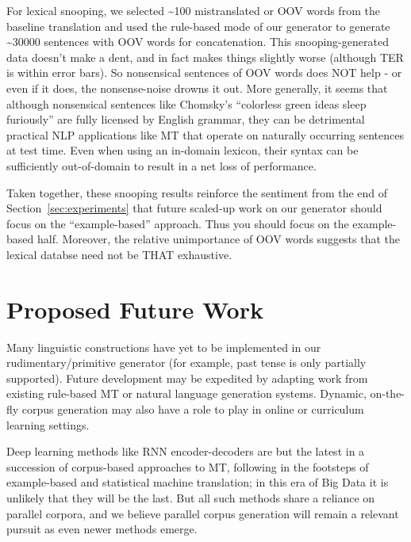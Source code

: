 {For lexical snooping, we selected \textasciitilde 100 mistranslated or OOV words from the baseline translation and used the rule-based mode of our generator to generate \textasciitilde 30000 sentences with OOV words for concatenation.
This snooping-generated data doesn't make a dent, and in fact makes things slightly worse (although TER is within error bars).
So nonsensical sentences of OOV words does NOT help - or even if it does, the nonsense-noise drowns it out.
More generally, it seems that although nonsensical sentences like Chomsky's ``colorless green ideas sleep furiously'' are fully licensed by English grammar, they can be detrimental practical NLP applications like MT that operate on naturally occurring sentences at test time.
Even when using an in-domain lexicon, their syntax can be sufficiently out-of-domain to result in a net loss of performance.

Taken together, these snooping results reinforce the sentiment from the end of Section~\ref{sec:experiments} that future scaled-up work on our generator should focus on the ``example-based'' approach.
Thus you should focus on the example-based half.
Moreover, the relative unimportance of OOV words suggests that the lexical databse need not be THAT exhaustive.






% 




} %








\section{Proposed Future Work}
\label{sec:future}


Many linguistic constructions have yet to be implemented in our rudimentary/primitive generator (for example, past tense is only partially supported).
Future development may be expedited by adapting work from existing rule-based MT or natural language generation systems. 
Dynamic, on-the-fly corpus generation may also have a role to play in online or curriculum learning settings.

Deep learning methods like RNN encoder-decoders  are but the latest in a succession of corpus-based approaches to MT, following in the footsteps of example-based and statistical machine translation; in this era of Big Data it is unlikely that they will be the last.
But all such methods share a reliance on parallel corpora, and we believe parallel corpus generation will remain a relevant pursuit as even newer methods emerge.

